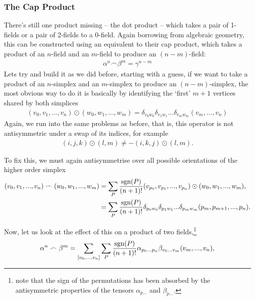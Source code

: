 \documentclass[11pt, oneside]{article} %
\numberwithin{equation}{section}
\begin{document}
\subsubsection{The Cap Product}
There's still one product missing -- the dot product -- which takes a pair of 1-fields or a pair of 2-fields to a 0-field. Again borrowing from algebraic geometry, this can be constructed using an equivalent to their cap product, which takes a product of an $n$-field and an $m$-field to produce an $(n-m)$-field:
\begin{align}
    \alpha^n \frown \beta^m = \gamma ^{n-m}
\end{align}
Lets try and build it as we did before, starting with a guess, if we want to take a product of an $n$-simplex and an $m$-simplex to produce an $(n-m)$-simplex, the most obvious way to do it is basically by identifying the `first' $m+1$ vertices shared by both simplices
\begin{align}
    (v_0, v_1, ... ,v_n)\odot(w_0, w_1, ... ,w_m) 
    = 
    \delta_{v_0 w_0}
    \delta_{v_1 w_1}
    ...
    \delta_{v_m w_m}
    (v_m,...,v_n)
\end{align}
Again, we run into the same problems as before, that is, this operator is not antisymmetric under a swap of its indices, for example
\begin{align}
    (i,j,k)\odot (l,m) \neq - (i,k,j) \odot (l,m).
\end{align}
\begin{incorrect}
    
To fix this, we must again antisymmetrise over all possible orientations of the higher order simplex
\begin{align}
    (v_0, v_1, ... ,v_n)\frown(w_0, w_1, ... ,w_m) 
    &=
    \sum_{P} 
    \frac{\textup{sgn}(P) }{(n+1)!}
    (v_{p_0}, v_{p_1}, ... ,v_{p_n}) 
    \odot 
    (w_0, w_1, ... ,w_m),\\
    &= 
    \sum_{P} 
    \frac{\textup{sgn}(P)}{(n+1)!}
    \delta_{p_0 w_0}
    \delta_{p_1 w_1}
    ...
    \delta_{p_m w_m}
    (p_{m}, p_{m+1},...,p_n).
\end{align}
\end{incorrect}
Now, let us look at the effect of this on a product of two fields,\footnote{note that the sign of the permutations has been absorbed by the antisymmetric properties of the tensors $\alpha_{p...}$ and $\beta_{p...}$.}
\begin{align}\label{eqn:field_cap_product}
    \alpha^n \frown \beta^m = \sum_{[v_0, ...,v_{n}]} 
    \sum_{P} \frac{\textup{sgn}(P)}{(n+1)!} \alpha_{p_0 ...p_n}\beta_{v_0 ...v_m} (v_m,...,v_{n}),
\end{align}
\end{document}

